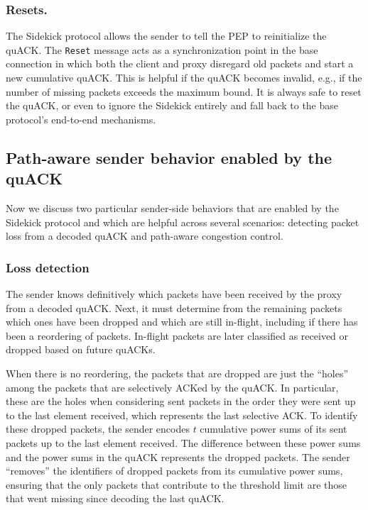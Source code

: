\subsubsection{Resets.}
The Sidekick protocol allows the sender to tell the PEP to reinitialize the
quACK. The \texttt{Reset} message acts as a synchronization point in the base
connection in which both the client and proxy disregard old packets and start
a new cumulative quACK. This is helpful if the quACK becomes invalid, e.g.,
if the number of missing packets exceeds the maximum bound. It is always safe
to reset the quACK, or even to ignore the Sidekick entirely and fall back to the
base protocol's end-to-end mechanisms.


\subsection{Path-aware sender behavior enabled by the quACK}
\label{sec:sidekick:sender}

Now we discuss two particular sender-side behaviors that are enabled by the
Sidekick protocol and which are helpful across several scenarios: detecting
packet loss from a decoded quACK and path-aware congestion control.


\subsubsection{Loss detection}
\label{sec:sidekick:sender:loss-detection}

The sender knows definitively which packets have been received by the proxy from
a decoded quACK. Next, it must determine from the remaining packets which ones
have been dropped and which are still in-flight, including if there has been a
reordering of packets. In-flight packets are later classified as received or
dropped based on future quACKs.

When there is no reordering, the packets that are dropped are just the ``holes''
among the packets that are selectively ACKed by the quACK. In particular, these
are the holes when considering sent packets in the order they were sent up to
the last element received, which represents the last selective ACK. To identify
these dropped packets, the sender encodes $t$ cumulative power sums of its sent
packets up to the last element received. The difference between these power
sums and the power sums in the quACK represents the dropped packets. The sender
``removes'' the identifiers of dropped packets from its cumulative power sums,
ensuring that the only packets that contribute to the threshold limit are those
that went missing since decoding the last quACK.

